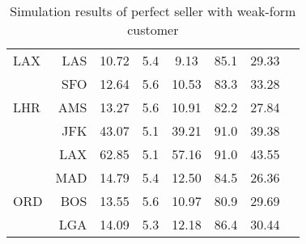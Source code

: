 \begin{table}[h]
\begin{center}
\begin{tabular}{l r c c c c c c}
LAX  &  LAS &  10.72  &    5.4  &   9.13  &   85.1  &  29.33  \\
     &  SFO &  12.64  &    5.6  &  10.53  &   83.3  &  33.28  \\[.5ex]
LHR  &  AMS &  13.27  &    5.6  &  10.91  &   82.2  &  27.84  \\
     &  JFK &  43.07  &    5.1  &  39.21  &   91.0  &  39.38  \\
     &  LAX &  62.85  &    5.1  &  57.16  &   91.0  &  43.55  \\
     &  MAD &  14.79  &    5.4  &  12.50  &   84.5  &  26.36  \\[.5ex]
ORD  &  BOS &  13.55  &    5.6  &  10.97  &   80.9  &  29.69  \\
     &  LGA &  14.09  &    5.3  &  12.18  &   86.4  &  30.44  \\
            \bottomrule
        \end{tabular}
        \caption{Simulation results of perfect seller with weak-form customer}
        \label{tbl:resultsBS}
    \end{center}
\end{table}





